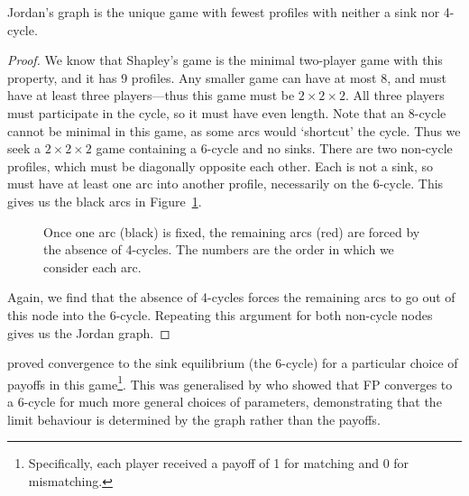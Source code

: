 \documentclass[preprint,authoryear]{elsarticle}
\newcommand{\toprove}[1]{\todo[color=green]{#1}}
\begin{document}
\begin{lem} \label{jordan uniquenesss}
    Jordan's graph is the unique game with fewest profiles with neither a sink nor 4-cycle.
\end{lem}
\begin{proof}
    We know that Shapley's game is the minimal two-player game with this property, and it has 9 profiles. Any smaller game can have at most 8, and must have at least three players---thus this game must be $2\times 2\times 2$. All three players must participate in the cycle, so it must have even length. Note that an 8-cycle cannot be minimal in this game, as some arcs would `shortcut' the cycle. Thus we seek a $2\times 2\times 2$ game containing a 6-cycle and no sinks. There are two non-cycle profiles, which must be diagonally opposite each other. Each is not a sink, so must have at least one arc into another profile, necessarily on the 6-cycle. This gives us the black arcs in Figure~\ref{fig:proof jordan}. 

    \begin{figure}
        \centering
        
        \caption{Once one arc (black) is fixed, the remaining arcs (red) are forced by the absence of 4-cycles. The numbers are the order in which we consider each arc.}
        \label{fig:proof jordan}
    \end{figure}
    Again, we find that the absence of 4-cycles forces the remaining arcs to go out of this node into the 6-cycle. Repeating this argument for both non-cycle nodes gives us the Jordan graph.
\end{proof}

\citeauthor{jordan_three_1993} proved convergence to the sink equilibrium (the 6-cycle) for a particular choice of payoffs in this game\footnote{Specifically, each player received a payoff of 1 for matching and 0 for mismatching.}. This was generalised by \cite{gaunersdorfer_fictitious_1995} who showed that FP converges to a 6-cycle for much more general choices of parameters, demonstrating that the limit behaviour is determined by the graph rather than the payoffs.
\begin{comment}
empirical Later, \cite{kleinberg_beyond_2011} proved convergence of the replicator dynamic to the 6-cycle for a one-parameter family of games with this graph. Given the intuition we have developed here, one might suspect that convergence to the 6-cycle in this game is a graph property, and hence true for \emph{any game} possessing this graph. This turns out to be the case.

\begin{lem} \label{jordan FP convergence}
    Fictitious play converges to the sink equilibrium in any game with Jordan's graph.
\end{lem}
\toprove{prove this}
\end{comment}
\end{document}
